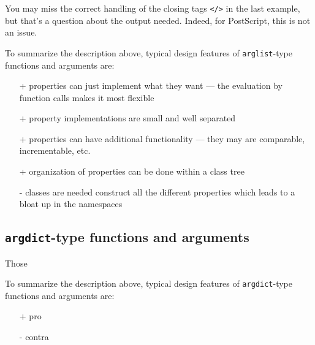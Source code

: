 \documentclass{article}
\begin{document}
You may miss the correct handling of the closing tags \verb|</>| in
the last example, but that's a question about the output needed.
Indeed, for PostScript, this is not an issue.

To summarize the description above, typical design features of
\verb|arglist|-type functions and arguments are:

\begin{itemize}
\item[+]
properties can just implement what they want --- the evaluation by
function calls makes it most flexible
\item[+]
property implementations are small and well separated
\item[+]
properties can have additional functionality --- they may are
comparable, incrementable, etc.
\item[+]
organization of properties can be done within a class tree
\item[-]
classes are needed construct all the different properties which leads
to a bloat up in the namespaces
\end{itemize}

\subsection*{\texttt{argdict}-type functions and arguments}

Those 

To summarize the description above, typical design features of
\verb|argdict|-type functions and arguments are:
\begin{itemize}
\item[+]pro
\item[-]contra
\end{itemize}
\end{document}
